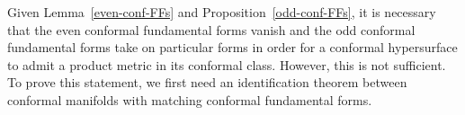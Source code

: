 \documentclass[a4paper,10.9pt]{amsart}
\theoremstyle{definition}
\theoremstyle{remark}
\newcommand{\IIo}{\hspace{0.4mm}\mathring{\rm{ I\hspace{-.2mm} I}}{\hspace{.0mm}}}
\newcommand{\IIIo}{{\mathring{{\bf\rm I\hspace{-.2mm} I \hspace{-.2mm} I}}{\hspace{.2mm}}}{}}
\numberwithin{equation}{section}
\renewcommand{\=}{\stackrel \Sigma =}
\newcommand{\FF}[1]{\underline{\overline{\rm{#1}}}}
\begin{document}
%
%

\medskip

Given Lemma~\ref{even-conf-FFs} and Proposition~\ref{odd-conf-FFs}, it is necessary that the even conformal fundamental forms vanish and the odd conformal fundamental forms take on particular forms in order for a conformal hypersurface 
 to admit a product metric in its conformal class. However, this is not sufficient. To prove this statement, we first need an identification theorem between conformal manifolds with matching conformal fundamental forms.
\end{document}
